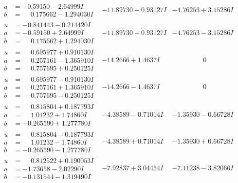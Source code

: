 \documentclass[1p]{elsarticle_modified}
\theoremstyle{definition}
\begin{document}
$$\begin{array}{c|c|c}
\begin{aligned}
a &= -0.59150 - 2.64999 I \\
b &= \phantom{-}0.175662 - 1.294030 I\end{aligned}
 & -11.89730 + 0.93127 I & -4.76253 + 3.15286 I \\ \hline\begin{aligned}
u &= -0.841443 - 0.214420 I \\
a &= -0.59150 + 2.64999 I \\
b &= \phantom{-}0.175662 + 1.294030 I\end{aligned}
 & -11.89730 - 0.93127 I & -4.76253 - 3.15286 I \\ \hline\begin{aligned}
u &= \phantom{-}0.695977 + 0.910130 I \\
a &= \phantom{-}0.257161 - 1.365910 I \\
b &= \phantom{-}0.757695 + 0.250125 I\end{aligned}
 & -14.2666 + 1.4637 I & \phantom{-0.000000 } 0 \\ \hline\begin{aligned}
u &= \phantom{-}0.695977 - 0.910130 I \\
a &= \phantom{-}0.257161 + 1.365910 I \\
b &= \phantom{-}0.757695 - 0.250125 I\end{aligned}
 & -14.2666 - 1.4637 I & \phantom{-0.000000 } 0 \\ \hline\begin{aligned}
u &= \phantom{-}0.815804 + 0.187793 I \\
a &= \phantom{-}1.01232 + 1.74860 I \\
b &= -0.265590 + 1.277780 I\end{aligned}
 & -4.38589 - 0.71014 I & -1.35930 - 0.66728 I \\ \hline\begin{aligned}
u &= \phantom{-}0.815804 - 0.187793 I \\
a &= \phantom{-}1.01232 - 1.74860 I \\
b &= -0.265590 - 1.277780 I\end{aligned}
 & -4.38589 + 0.71014 I & -1.35930 + 0.66728 I \\ \hline\begin{aligned}
u &= \phantom{-}0.812522 + 0.190053 I \\
a &= -1.73658 - 2.02290 I \\
b &= -0.131544 - 1.319490 I\end{aligned}
 & -7.92837 + 3.04454 I & -7.11238 - 3.82066 I \\ \hline\begin{aligned}

\end{aligned}
\end{array}$$
\end{document}
